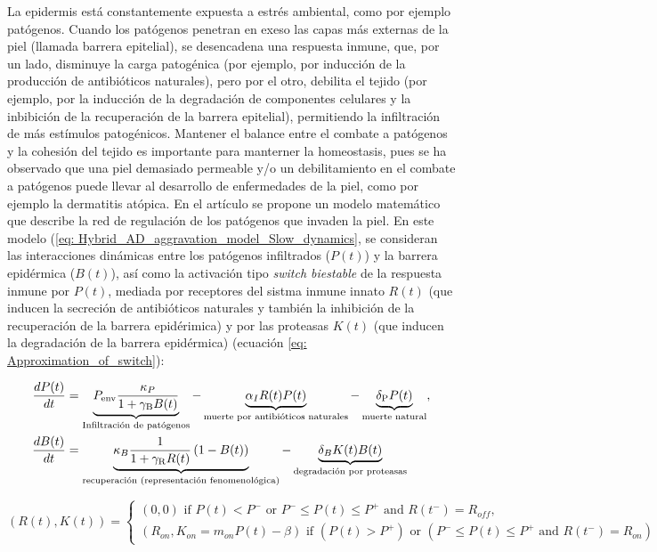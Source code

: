 \documentclass[10pt,letterpaper]{article}
\begin{document}
La epidermis está constantemente expuesta a estrés ambiental, como por ejemplo patógenos. Cuando los patógenos penetran en exeso las capas más externas de la piel (llamada barrera epitelial), se desencadena una respuesta inmune, que, por un lado, disminuye la carga patogénica (por ejemplo, por inducción de la producción de antibióticos naturales), pero por el otro, debilita el tejido (por ejemplo, por la inducción de la degradación de componentes celulares y la inbibición de la recuperación de la barrera epitelial), permitiendo la infiltración de más estímulos patogénicos. Mantener el balance entre el combate a patógenos y la cohesión del tejido es importante para manterner la homeostasis, pues se ha observado que una piel demasiado permeable y/o un debilitamiento en el combate a patógenos puede llevar al desarrollo de enfermedades de la piel, como por ejemplo la dermatitis atópica. En el artículo \cite{Dominguez-Huttinger2016a} se propone un modelo matemático que describe la red de regulación de los patógenos que invaden la piel. En este modelo (\ref{eq: Hybrid_AD_aggravation_model_Slow_dynamics}, se  consideran las interacciones dinámicas entre los patógenos infiltrados ($P(t)$) y la barrera epidérmica ($B(t)$), así como la activación tipo \textit{switch biestable} de la respuesta inmune por $P(t)$, mediada por receptores del sistma inmune innato $R(t)$ (que inducen la secreción de antibióticos naturales y también la inhibición de la recuperación de la barrera epidérimica) y por las proteasas $K(t)$ (que inducen la  degradación de la barrera epidérmica)  (ecuación \ref{eq: Approximation_of_switch}):

\begin{subequations}
    \begin{align}
    \frac{dP(t)}{dt} &= \underbrace{P_{\rm env}\frac{\kappa_P}{1+\gamma_{\rm B} B(t)}}_\text{Infiltración de patógenos}  -\underbrace{ \alpha_I R(t)P(t)}_\text{muerte por antibióticos naturales}-\underbrace{\delta_{\rm P}P(t)}_\text{muerte natural}, \\
    \frac{dB(t)}{dt}&=\underbrace{\kappa_B \frac{1}{1+\gamma_{\rm R} R(t)}
    \left(1-B(t)\right)}_\text{recuperación (representación fenomenológica)} -\underbrace{\delta_B K(t)B(t)}_\text{degradación por proteasas}
        \end{align}
    \label{eq: Hybrid_AD_aggravation_model_Slow_dynamics}
\end{subequations}


\begin{equation}
(R(t),K(t))= 
\begin{cases}
(0, 0 ) \mbox{ if } P(t)<P^- \mbox{ or }  P^- \leq P(t) \leq P^+ \mbox{ and } R(t^- )=R_{off} ,\\
(R_{on},K_{on}=m_{on} P(t)-\beta)  \mbox{ if }  (P(t)>P^+)  \mbox{ or }  (P^-\leq P(t)\leq P^+  \mbox{ and }  R(t^- )=R_{on})
\end{cases}
 \label{eq: Approximation_of_switch}
\end{equation}
\end{document}
